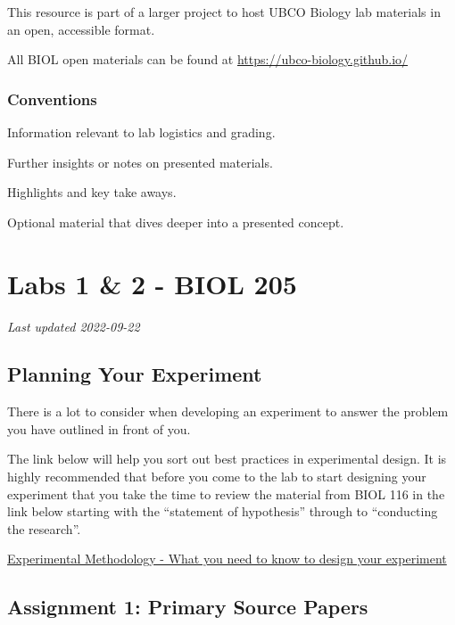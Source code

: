 \documentclass[
]{book}
\begin{document}
This resource is part of a larger project to host UBCO Biology lab materials in an open, accessible format.

All BIOL open materials can be found at \url{https://ubco-biology.github.io/}

\hypertarget{conventions}{%
\section*{Conventions}\label{conventions}}

Information relevant to lab logistics and grading.

Further insights or notes on presented materials.

Highlights and key take aways.

Optional material that dives deeper into a presented concept.

\hypertarget{part-labs-1-2---biol-205}{%
\part*{Labs 1 \& 2 - BIOL 205}\label{part-labs-1-2---biol-205}}

\emph{Last updated 2022-09-22}

\hypertarget{planning-your-experiment}{%
\chapter*{Planning Your Experiment}\label{planning-your-experiment}}

There is a lot to consider when developing an experiment to answer the problem you have outlined in front of you.

The link below will help you sort out best practices in experimental design. It is highly recommended that before you come to the lab to start designing your experiment that you take the time to review the material from BIOL 116 in the link below starting with the ``statement of hypothesis'' through to ``conducting the research''.

\href{https://ubco-biology.github.io/BIOL-116-Lab-Manual/statement-of-hypothesis.html}{Experimental Methodology - What you need to know to design your experiment}

\hypertarget{assignment-1-primary-source-papers}{%
\chapter*{Assignment 1: Primary Source Papers}\label{assignment-1-primary-source-papers}}
\end{document}

